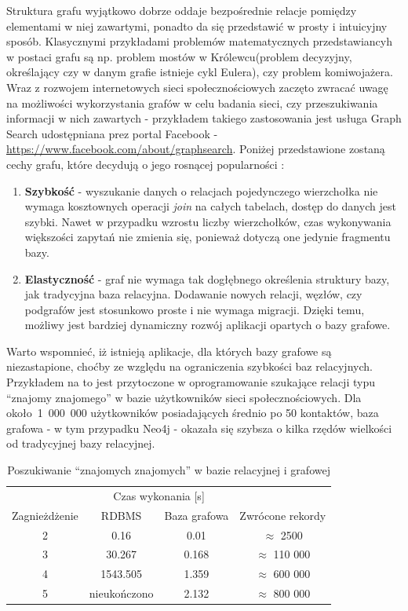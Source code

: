 Struktura grafu wyjątkowo dobrze oddaje bezpośrednie relacje pomiędzy elementami w niej zawartymi, ponadto da się przedstawić w prosty i intuicyjny 
sposób. Klasycznymi przykładami problemów matematycznych przedstawiancyh w postaci grafu są np. problem mostów w Królewcu(problem decyzyjny, określający
czy w danym grafie istnieje cykl Eulera), czy problem komiwojażera. Wraz z rozwojem internetowych sieci społecznościowych zaczęto zwracać uwagę na 
możliwości wykorzystania grafów w celu badania sieci, czy przeszukiwania informacji w nich zawartych - przykładem takiego zastosowania jest 
usługa Graph Search udostępniana prez portal Facebook -\url{https://www.facebook.com/about/graphsearch}. Poniżej przedstawione zostaną cechy grafu,
które decydują o jego rosnącej popularności \cite{graphDb}:
\begin{enumerate}
    \item \textbf{Szybkość} - wyszukanie danych o relacjach pojedynczego wierzchołka nie wymaga kosztownych operacji \emph{join} na całych tabelach,
    dostęp do danych jest szybki. Nawet w przypadku wzrostu liczby wierzchołków, czas wykonywania większości zapytań nie zmienia się, ponieważ dotyczą
    one jedynie fragmentu bazy.
    \item \textbf{Elastyczność} - graf nie wymaga tak dogłębnego określenia struktury bazy, jak tradycyjna baza relacyjna. Dodawanie nowych relacji, 
    węzłów, czy podgrafów jest stosunkowo proste i nie wymaga migracji. Dzięki temu, możliwy jest bardziej dynamiczny rozwój aplikacji opartych o bazy grafowe.
\end{enumerate}

Warto wspomnieć, iż istnieją aplikacje, dla których bazy grafowe są niezastapione, choćby ze względu na ograniczenia szybkości baz relacyjnych. Przykładem na to jest
przytoczone w \cite{neo4jAction} oprogramowanie szukające relacji typu ``znajomy znajomego'' w bazie użytkowników sieci społecznościowych. Dla około~1~000~000
użytkowników posiadających średnio po 50 kontaktów, baza grafowa - w tym przypadku Neo4j - okazała się szybsza o kilka rzędów wielkości od tradycyjnej bazy
relacyjnej.

\begin{table}[h!]
\centering
\label{tabela:neo4jAwesome}
\caption{Poszukiwanie ``znajomych znajomych'' w bazie relacyjnej i grafowej}
\begin{tabular}{cccc}
\hline
&  \multicolumn{2}{c}{Czas wykonania [s]} &\\
\cline{2-3}
Zagnieżdżenie & RDBMS & Baza grafowa & Zwrócone rekordy\\
\hline
2 & 0.16 & 0.01 & \(\approx\) 2500 \\
3 & 30.267 & 0.168 & \(\approx\) 110 000\\
4 & 1543.505 & 1.359 & \(\approx\) 600 000\\
5 & nieukończono & 2.132 & \(\approx\) 800 000\\ 
\hline
\end{tabular}
\end{table}


